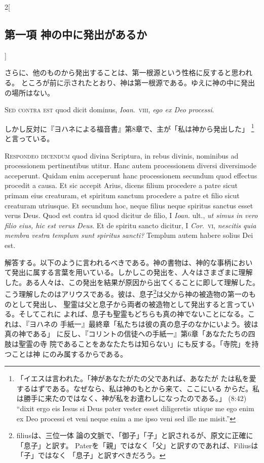 \documentclass[paper=a4paper,fontsize=10pt,jafontsize=9pt,titlepage]{jlreq}
\begin{document}
\begin{paracol}{2}[\subsection{第一項 神の中に発出があるか}]
\switchcolumn


さらに、他のものから発出することは、第一根源という性格に反すると思われる。
 ところが前に示されたとおり、神は第一根源である。ゆえに神の中に発出
 の場所はない。


\switchcolumn*[\subsection{s.c.}]


{\scshape Sed contra est} quod dicit dominus, {\itshape Ioan}.~{\scshape viii}, {\itshape ego ex Deo processi}.


\switchcolumn


しかし反対に『ヨハネによる福音書』第8章で、主が「私は神から発出した」
 \footnote{「イエスは言われた。「神があなたがたの父であれば、あなたが
 たは私を愛するはずである。なぜなら、私は神のもとから来て、ここにいる
 からだ。私は勝手に来たのではなく、神が私をお遣わしになったのである。」
 (8:42) ``dixit ergo eis Iesus si Deus pater vester esset diligeretis
 utique me ego enim ex Deo processi et veni neque enim a me ipso veni
 sed ille me misit.''} と言っている。




{\scshape Respondeo dicendum} quod divina Scriptura, in rebus divinis, nominibus ad
processionem pertinentibus utitur. Hanc autem processionem diversi
diversimode acceperunt. Quidam enim acceperunt hanc processionem
secundum quod effectus procedit a causa. Et sic accepit Arius, dicens
filium procedere a patre sicut primam eius creaturam, et spiritum
sanctum procedere a patre et filio sicut creaturam utriusque. Et
secundum hoc, neque filius neque spiritus sanctus esset verus Deus. Quod
est contra id quod dicitur de filio, I {\itshape Ioan}. ult., {\itshape ut simus in vero
filio eius, hic est verus Deus}. Et de spiritu sancto dicitur, I {\itshape Cor}.~{\scshape vi},
{\itshape nescitis quia membra vestra templum sunt spiritus sancti?} Templum autem
habere solius Dei est.


\switchcolumn


解答する。以下のように言われるべきである。神の書物は、神的な事柄におい
て発出に属する言葉を用いている。しかしこの発出を、人々はさまざまに理解
した。ある人々は、この発出を結果が原因から出てくることに即して理解した。
こう理解したのはアリウスである。彼は、息子\footnote{filiusは、三位一体
論の文脈で、「御子」「子」と訳されるが、原文に正確に「息子」と訳す。
Paterを「親」ではなく「父」と訳すのであれば、Filiusは「子」ではなく
「息子」と訳すべきだろう。}は父から神の被造物の第一のものとして発出し、
聖霊は父と息子から両者の被造物として発出すると言っている。そしてこれに
よれば、息子も聖霊もどちらも真の神でないことになる。これは、『ヨハネの
手紙一』最終章「私たちは彼の真の息子のなかにいよう。彼は真の神である」
に反し、『コリントの信徒への手紙一』第6章「あなたたちの四肢は聖霊の寺
院であることをあなたたちは知らない」にも反する。「寺院」を持つことは神
にのみ属するからである。



\end{paracol}
\end{document}
